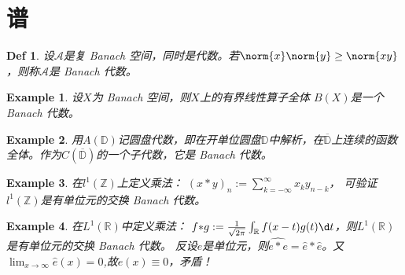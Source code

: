\documentclass{ctexart}
\newif\ifpreface
\newtheorem{definition}{Def}
\newtheorem{example}{Example}
\begin{document}
\large
\setlength{\baselineskip}{1.2em}
\ifpreface

\else
\maketitle
\fi
{}
\section{谱}
\begin{definition}\label{def:banach_algebra}
  设\(\mathcal{A} \)是复 Banach 空间，同时是代数。若\(\norm{x}\norm{y} \geq \norm{xy} \)，则称\(\mathcal{A} \)是 Banach 代数。
\end{definition}

\begin{example}\label{exa:banach_algebra_1}
  设\(X \)为 Banach 空间，则\(X \)上的有界线性算子全体 \(B(X) \)是一个 Banach 代数。
\end{example}

\begin{example}\label{exa:banach_algebra_2}
  用\(A(\mathbb{D}) \)记圆盘代数，即在开单位圆盘\(\mathbb{D} \)中解析，在\(\overline{\mathbb{D}} \)上连续的函数全体。作为\(C(\overline{\mathbb{D}}) \)的一个子代数，它是 Banach 代数。
\end{example}

\begin{example}\label{exa:banach_algebra_3}
  在\(l^1(\mathbb{Z}) \)上定义乘法：
  \((x {*} y)_n := \sum_{k = - \infty}^{\infty}x_k y_{n-k} \)，
  可验证\(l^1(\mathbb{Z}) \)是有单位元的交换 Banach 代数。
\end{example}

\begin{example}\label{exa:banach_algrbra_4}
  在\(L^1(\mathbb{R}) \)中定义乘法：
  \(f {*} g := \frac{1}{\sqrt{2 \pi}} \int_{\mathbb{R}} f(x - t)g(t) \d t \)，则\(L^1(\mathbb{R}) \)是有单位元的交换 Banach 代数。
  反设\(e \)是单位元，则\(\hat{e {*} e} = \hat{e} {*} \hat{e} \)。又\(\lim_{x \to \infty} \hat{e}(x)=0 \),故\(e(x)\equiv 0 \)，矛盾！
\end{example}
\end{document}
